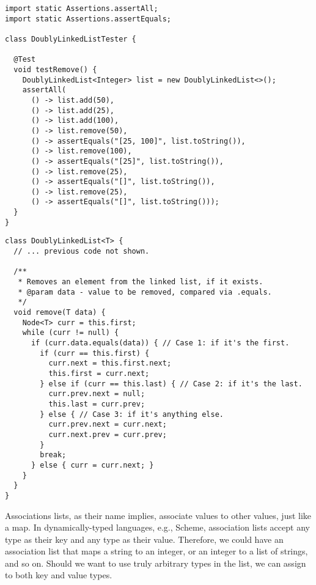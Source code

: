 \begin{lstlisting}[language=MyJava]
import static Assertions.assertAll;
import static Assertions.assertEquals;

class DoublyLinkedListTester {

  @Test
  void testRemove() {
    DoublyLinkedList<Integer> list = new DoublyLinkedList<>();
    assertAll(
      () -> list.add(50),
      () -> list.add(25),
      () -> list.add(100),
      () -> list.remove(50),
      () -> assertEquals("[25, 100]", list.toString()),
      () -> list.remove(100),
      () -> assertEquals("[25]", list.toString()),
      () -> list.remove(25),
      () -> assertEquals("[]", list.toString()),
      () -> list.remove(25),
      () -> assertEquals("[]", list.toString()));
  }
}
\end{lstlisting}

\begin{lstlisting}[language=MyJava]
class DoublyLinkedList<T> {
  // ... previous code not shown.

  /**
   * Removes an element from the linked list, if it exists.
   * @param data - value to be removed, compared via .equals.
   */
  void remove(T data) {
    Node<T> curr = this.first;
    while (curr != null) {
      if (curr.data.equals(data)) { // Case 1: if it's the first.
        if (curr == this.first) {
          curr.next = this.first.next;
          this.first = curr.next;
        } else if (curr == this.last) { // Case 2: if it's the last.
          curr.prev.next = null;
          this.last = curr.prev;
        } else { // Case 3: if it's anything else.
          curr.prev.next = curr.next;
          curr.next.prev = curr.prev;
        }
        break;
      } else { curr = curr.next; }
    }
  }
}
\end{lstlisting}


Associations lists, as their name implies, associate values to other values, just like a map. In dynamically-typed languages, e.g., Scheme, association lists accept any type as their key and any type as their value. Therefore, we could have an association list that maps a string to an integer, or an integer to a list of strings, and so on. Should we want to use truly arbitrary types in the list, we can assign  to both key and value types.

